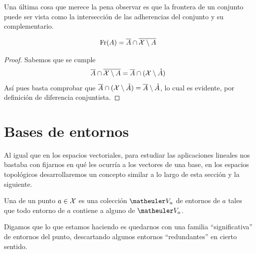 Una última cosa que merece la pena observar es que la frontera de un conjunto puede ser vista como la intersección de las adherencias del conjunto y su complementario.
\begin{lem}
	\begin{equation*}
		\operatorname{\mathrm{Fr}}(A)=\overline{A}\cap\overline{\mathcal{X} \setminus A}
	\end{equation*}
\end{lem}
\begin{proof}
	Sabemos que se cumple
	\begin{equation*}
		\overline{A}\cap\overline{\mathcal{X} \setminus A}=\overline{A}\cap(\mathcal{X} \setminus \mathring{A})
	\end{equation*}
	Así pues basta comprobar que $\overline{A}\cap(\mathcal{X} \setminus \mathring{A})=\overline{A}\setminus \mathring{A}$, lo cual es evidente, por definición de diferencia conjuntista.
\end{proof}

\section{Bases de entornos}
Al igual que en los espacios vectoriales, para estudiar las aplicaciones lineales nos bastaba con fijarnos en qué les ocurría a los vectores de una base, en los espacios topológicos desarrollaremos un concepto similar a lo largo de esta sección y la siguiente.
\begin{defi}
	\label{etop_bases_entornos}
	Una  de un punto $a\in\mathcal{X}$ es una colección $\Va{a}$ de entornos de $a$ tales que todo entorno de $a$ contiene a alguno de $\Va{a}$.
\end{defi}

Digamos que lo que estamos haciendo es quedarnos con una familia ``significativa'' de entornos del punto, descartando algunos entornos ``redundantes'' en cierto sentido.

